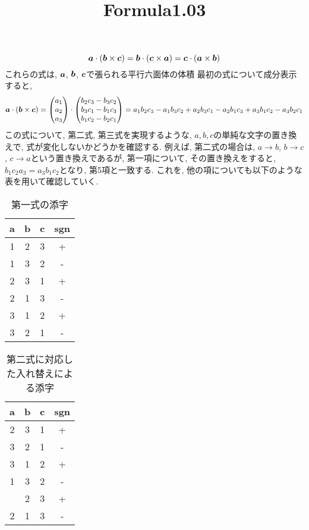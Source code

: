 \documentclass{jsarticle}
\title{Formula1.03}
\newcommand*{\mbold}[1]{\mbox{\boldmath $#1$}}
\begin{document}
\maketitle
\[
  \mbold{a} \cdot (\mbold{b} \times \mbold{c}) = \mbold{b} \cdot (\mbold{c} \times \mbold{a}) = \mbold{c} \cdot (\mbold{a} \times \mbold{b})
\]
これらの式は, $\mbold{a}$, $\mbold{b}$, $\mbold{c}$で張られる平行六面体の体積
最初の式について成分表示すると, 
\[
  \mbold{a} \cdot (\mbold{b} \times \mbold{c}) = 
  \begin{pmatrix}
        a_1 \\
        a_2 \\
        a_3
  \end{pmatrix}
  \cdot
  \begin{pmatrix}
    b_2 c_3 - b_3 c_2 \\
    b_3 c_1 - b_1 c_3 \\
    b_1 c_2 - b_2 c_1
  \end{pmatrix}
  = a_1 b_2 c_3 - a_1 b_3 c_2 + a_2 b_3 c_1 - a_2 b_1 c_3 + a_3 b_1 c_2 - a_3 b_2 c_1
\]
この式について, 第二式, 第三式を実現するような, $a, b, c$の単純な文字の置き換えで, 式が変化しないかどうかを確認する. 
例えば, 第二式の場合は, $a \rightarrow b$, $b \rightarrow c$, $c \rightarrow a$という置き換えであるが, 第一項について, その置き換えをすると, $b_1 c_2 a_3 = a_3 b_1 c_2$となり, 第5項と一致する. これを, 他の項についても以下のような表を用いて確認していく. 
\begin{table}[hbtp]
  \caption{第一式の添字}
  \centering
  \begin{tabular}{|c|c|c|c|}
    \hline
    a & b & c & sgn \\
    \hline \hline
    1 & 2 & 3 & + \\
    \hdashline
    \rowcolor{yellow}1 & 3 & 2 & - \\
    \hdashline
    \rowcolor{green}2 & 3 & 1 & + \\
    \hdashline
    \rowcolor{red}2 & 1 & 3 & - \\
    \hdashline
    \rowcolor{cyan}3 & 1 & 2 & + \\
    \hdashline
    \rowcolor{magenta}3 & 2 & 1 & - \\
    \hline
  \end{tabular}
\end{table}

\begin{table}[hbtp]
  \caption{第二式に対応した入れ替えによる添字}
  \centering
  \begin{tabular}{|c|c|c|c|}
    \hline
    a & b & c & sgn \\
    \hline \hline
    \rowcolor{green}2 & 3 & 1 & + \\
    \hdashline
    \rowcolor{magenta}3 & 2 & 1 & - \\
    \hdashline
    \rowcolor{cyan}3 & 1 & 2 & + \\
    \hdashline
    \rowcolor{yellow}1 & 3 & 2 & - \\
    \hdashline
    1 & 2 & 3 & + \\
    \hdashline
    \rowcolor{red}2 & 1 & 3 & - \\
    \hline
  \end{tabular}
\end{table}
\end{document}
